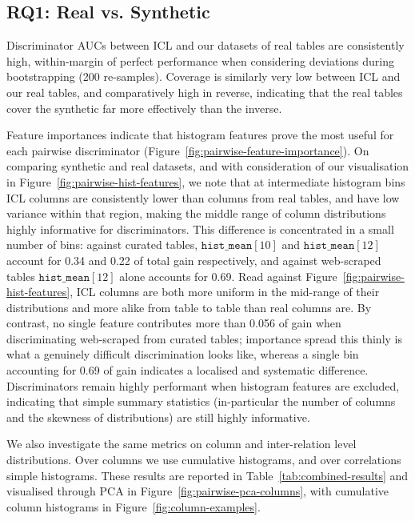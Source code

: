 \documentclass{article}
\begin{document}
\subsection{RQ1: Real vs. Synthetic}

Discriminator AUCs between ICL and our datasets of real tables are consistently high, within-margin of perfect performance when considering deviations during bootstrapping (200 re-samples). 
Coverage is similarly very low between ICL and our real tables, and comparatively high in reverse, indicating that the real tables cover the synthetic far more effectively than the inverse.

Feature importances indicate that histogram features prove the most useful for each pairwise discriminator (Figure~\ref{fig:pairwise-feature-importance}).
On comparing synthetic and real datasets, and with consideration of our visualisation in Figure~\ref{fig:pairwise-hist-features}, we note that at intermediate histogram bins ICL columns are consistently lower than columns from real tables, and have low variance within that region, making the middle range of column distributions highly informative for discriminators.
This difference is concentrated in a small number of bins: against curated tables, $\texttt{hist\_mean}[10]$ and $\texttt{hist\_mean}[12]$ account for 0.34 and 0.22 of total gain respectively, and against web-scraped tables $\texttt{hist\_mean}[12]$ alone accounts for 0.69.
Read against Figure~\ref{fig:pairwise-hist-features}, ICL columns are both more uniform in the mid-range of their distributions and more alike from table to table than real columns are.
By contrast, no single feature contributes more than 0.056 of gain when discriminating web-scraped from curated tables; importance spread this thinly is what a genuinely difficult discrimination looks like, whereas a single bin accounting for 0.69 of gain indicates a localised and systematic difference.
Discriminators remain highly performant when histogram features are excluded, indicating that simple summary statistics (in-particular the number of columns and the skewness of distributions) are still highly informative.

We also investigate the same metrics on column and inter-relation level distributions.
Over columns we use cumulative histograms, and over correlations simple histograms.
These results are reported in Table~\ref{tab:combined-results} and visualised through PCA in Figure~\ref{fig:pairwise-pca-columns}, with cumulative column histograms in Figure~\ref{fig:column-examples}.
\end{document}
